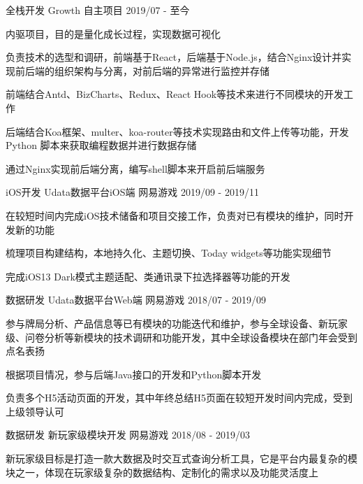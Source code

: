 \begin{cventries}
  \cventry
    {全栈开发}
    {Growth}
    {自主项目}
    {2019/07 - 至今}
    {
      \begin{cvitems}
        \item {内驱项目，目的是量化成长过程，实现数据可视化}
        \item {负责技术的选型和调研，前端基于React，后端基于Node.js，结合Nginx设计并实现前后端的组织架构与分离，对前后端的异常进行监控并存储}
        \item {前端结合Antd、BizCharts、Redux、React Hook等技术来进行不同模块的开发工作}
        \item {后端结合Koa框架、multer、koa-router等技术实现路由和文件上传等功能，开发 Python 脚本来获取编程数据并进行数据存储}
        \item {通过Nginx实现前后端分离，编写shell脚本来开启前后端服务}
      \end{cvitems}
    }
  \cventry
    {iOS开发}
    {Udata数据平台iOS端}
    {网易游戏}
    {2019/09 - 2019/11}
    {
      \begin{cvitems}
        \item {在较短时间内完成iOS技术储备和项目交接工作，负责对已有模块的维护，同时开发新的功能}
        \item {梳理项目构建结构，本地持久化、主题切换、Today widgets等功能实现细节}
        \item {完成iOS13 Dark模式主题适配、类通讯录下拉选择器等功能的开发}
      \end{cvitems}
    }
  \cventry
    {数据研发}
    {Udata数据平台Web端}
    {网易游戏}
    {2018/07 - 2019/09}
    {
      \begin{cvitems}
        \item {参与牌局分析、产品信息等已有模块的功能迭代和维护，参与全球设备、新玩家级、问卷分析等新模块的技术调研和功能开发，其中全球设备模块在部门年会受到点名表扬}
        \item {根据项目情况，参与后端Java接口的开发和Python脚本开发}
        \item {负责多个H5活动页面的开发，其中年终总结H5页面在较短开发时间内完成，受到上级领导认可}
      \end{cvitems}
    }
  \cventry
    {数据研发}
    {新玩家级模块开发}
    {网易游戏}
    {2018/08 - 2019/03}
    {
      \begin{cvitems}
        \item {新玩家级目标是打造一款大数据及时交互式查询分析工具，它是平台内最复杂的模块之一，体现在玩家级复杂的数据结构、定制化的需求以及功能灵活度上}

\end{cvitems}}
\end{cventries}

